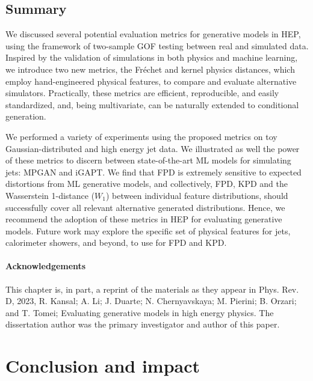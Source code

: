 \section{Summary}
\label{sec:04_evaluating_conclusion}

We discussed several potential evaluation metrics for generative models in HEP, using the framework of two-sample GOF testing between real and simulated data.
Inspired by the validation of simulations in both physics and machine learning, we introduce two new metrics, the Fr\'echet and kernel physics distances, which employ hand-engineered physical features, to compare and evaluate alternative simulators.
Practically, these metrics are efficient, reproducible, and easily standardized, and, being multivariate, can be naturally extended to conditional generation.

We performed a variety of experiments using the proposed metrics on toy Gaussian-distributed and high energy jet data.
We illustrated as well the power of these metrics to discern between state-of-the-art ML models for simulating jets: MPGAN and iGAPT.
We find that FPD is extremely sensitive to expected distortions from ML generative models, and collectively, FPD, KPD and the Wasserstein 1-distance ($W_1$) between individual feature distributions, should successfully cover all relevant alternative generated distributions.
Hence, we recommend the adoption of these metrics in HEP for evaluating generative models.
Future work may explore the specific set of physical features for jets, calorimeter showers, and beyond, to use for FPD and KPD.

\subsubsection{Acknowledgements}

This chapter is, in part, a reprint of the materials as they appear in
Phys. Rev. D, 2023, R. Kansal; A. Li; J. Duarte; N. Chernyavskaya; M. Pierini; B. Orzari; and T. Tomei; Evaluating generative models in high energy physics.
The dissertation author was the primary investigator and author of this paper.

\chapter{Conclusion and impact}
\label{sec:04_outlook}

